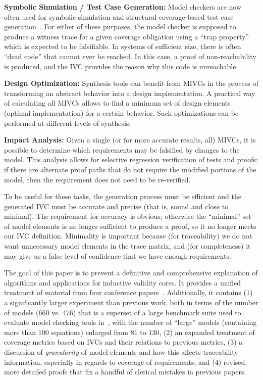 \noindent \textbf{Symbolic Simulation / Test Case Generation:} Model checkers are now often used for symbolic simulation and structural-coverage-based test case generation~\cite{SimulinkDesignVerifier,Whalen13:OMCDC}.  For either of these purposes, the model checker is supposed to produce a witness trace for a given coverage obligation using a ``trap property'' which is expected to be falsifiable.  In systems of sufficient size, there is often ``dead code'' that cannot ever be reached.  In this case, a proof of non-reachability is produced, and the IVC provides the reason why this code is unreachable.

\noindent \textbf{Design Optimization:} Synthesis tools can benefit from MIVCs in the process of transforming an abstract behavior into a design implementation. A practical way of calculating all MIVCs allows to find a minimum set of design elements (optimal implementation) for a certain behavior. Such optimizations can be performed at different levels of synthesis.

\noindent \textbf{Impact Analysis:} Given a single (or for more accurate results, all) MIVCs, it is possible to determine which requirements may be falsified by changes to the model.  This analysis allows for selective regression verification of tests and proofs: if there are alternate proof paths that do not require the modified portions of the model, then the requirement does not need to be re-verified.

To be useful for these tasks, the generation process must be efficient and the generated IVC must be accurate and precise (that is, sound and close to minimal).  The requirement for accuracy is obvious; otherwise the ``minimal'' set of model elements is no longer sufficient to produce a proof, so it no longer meets our IVC definition.  Minimality is important because (for traceability) we do not want unnecessary model elements in the trace matrix, and (for completeness) it may give us a false level of confidence that we have enough requirements.

The goal of this paper is to prevent a definitive and comprehensive explanation of algorithms and applications for inductive validity cores.  It provides a unified treatment of material from four conference papers~\cite{Ghass16,Murugesan16:renext,Ghass17Cov,Ghass17AllIVCs}.  Additionally, it contains (1) a significantly larger experiment than previous work, both in terms of the number of models (660 vs. 476) that is a superset of a large benchmark suite used to evaluate model checking tools in~\cite{piskac2016}, with the number of ``large'' models (containing more than 100 equations) enlarged from 81 to 130, (2) an expanded treatment of coverage metrics based on IVCs and their relations to previous metrics, (3) a discussion of {\em granularity} of model elements and how this affects traceability information, especially in regards to coverage of requirements, and (4) revised, more detailed proofs that fix a handful of clerical mistakes in previous papers.


